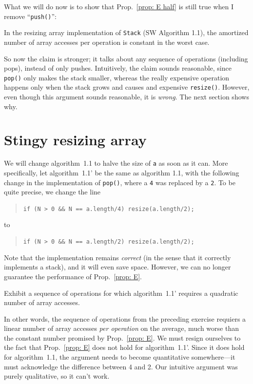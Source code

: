 \documentclass{tstextbook}
\begin{document}
What we will do now is to show that Prop.~\ref{prop: E half} is still true when I remove ``{\tt push()}'':

\begin{theorem}
  \label{prop: E}
  In the resizing array
  implementation of {\tt Stack} (SW Algorithm 1.1), the amortized number of
  array accesses per operation is constant in the worst case.
\end{theorem}

So now the claim is stronger; it talks about any sequence of operations (including pops), instead of only pushes.
Intuitively, the claim  sounds reasonable, since {\tt pop()} only makes the
stack smaller, whereas the really expensive operation happens only when
the stack grows and causes and expensive {\tt resize()}.
However, even though this argument sounds reasonable, it is \emph{wrong}.
The next section shows why.
\section{Stingy resizing array}
\label{sec-1.2}

We will change algorithm~1.1 to halve the size of {\tt a} as soon as
it can.  
More specifically, let algorithm~1.1' be the same as algorithm 1.1,
with the following change in the implementation of {\tt pop()}, where
a {\tt 4} was replaced by a {\tt 2}.
To be quite precise, we change the line
\begin{quote}
  {\tt if (N > 0 \&\& N == a.length/4) resize(a.length/2);}
\end{quote}
to 
\begin{quote}
  {\tt if (N > 0 \&\& N == a.length/2) resize(a.length/2);}
\end{quote}
   
Note that the implementation remains \emph{correct} (in the sense that it correctly implements a stack), and it will even save space. 
However, we can no longer guarantee the performance of Prop.~\ref{prop: E}.

\begin{ExerciseList}\small
  \Exercise{}
  Exhibit a sequence of operations for which algorithm~1.1' requires a quadratic number of array accesses.
\end{ExerciseList}

In other words, the sequence of operations from the preceding exercise requiers a linear number of array accesses \emph{per operation} on the average, much worse than the constant number
promised by Prop.~\ref{prop: E}.
We must resign ourselves to the fact that Prop.~\ref{prop: E} does not hold for algorithm~1.1'.
Since it does hold for algorithm~1.1, the argument needs to become quantitative somewhere---it must acknowledge the difference between 4 and 2.
Our intuitive argument was purely qualitative, so it can't work.
\end{document}
